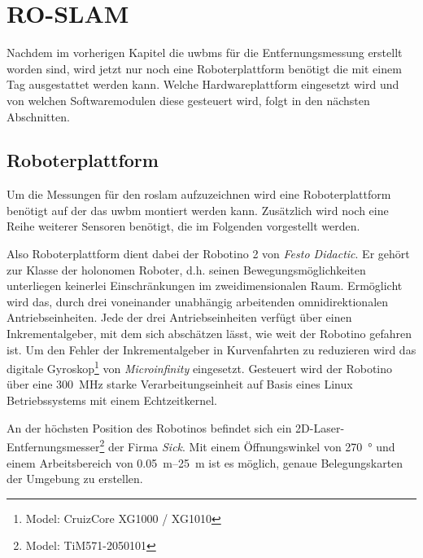 \begin{comment}
------------------------------------------------------------------------------------------
\end{comment}
\chapter{RO-SLAM}\label{ch:ro_slam}

Nachdem im vorherigen Kapitel die \Glspl{uwbm} für die Entfernungsmessung erstellt worden sind, wird jetzt nur noch eine Roboterplattform benötigt die mit einem Tag ausgestattet werden kann. Welche Hardwareplattform eingesetzt wird und von welchen Softwaremodulen diese gesteuert wird, folgt in den nächsten Abschnitten.

\begin{comment}
--------------------------------------------------------------------------------
- Einsatz mobiler Roboter in der Logistik am Beispiel des Robotino
	- http://www.r-moehrle.de/wissenschaftlicheArbeiten/robotino1.pdf
\end{comment}
\section{Roboterplattform}

Um die Messungen für den \Gls{roslam} aufzuzeichnen wird eine Roboterplattform benötigt auf der das \Gls{uwbm} montiert werden kann. Zusätzlich wird noch eine Reihe weiterer Sensoren benötigt, die im Folgenden vorgestellt werden.

Also Roboterplattform dient dabei der Robotino 2 von \textit{Festo Didactic}. Er gehört zur Klasse der holonomen Roboter, d.h. seinen Bewegungsmöglichkeiten unterliegen keinerlei Einschränkungen im zweidimensionalen Raum. Ermöglicht wird das, durch drei voneinander unabhängig arbeitenden omnidirektionalen Antriebseinheiten. Jede der drei Antriebseinheiten verfügt über einen Inkrementalgeber, mit dem sich abschätzen lässt, wie weit der Robotino gefahren ist. Um den Fehler der Inkrementalgeber in Kurvenfahrten zu reduzieren wird das digitale Gyroskop\footnote{Model: CruizCore XG1000 / XG1010} von \textit{Microinfinity} eingesetzt. Gesteuert wird der Robotino über eine \SI{300}{\MHz} starke Verarbeitungseinheit auf Basis eines Linux Betriebssystems mit einem Echtzeitkernel. \cite{festo2007robotinomanual}

An der höchsten Position des Robotinos befindet sich ein 2D-Laser-Entfernungsmesser\footnote{Model: TiM571-2050101} der Firma \textit{Sick}. Mit einem Öffnungswinkel von \SI{270}{\degree} und einem Arbeitsbereich von \SIrange{0.05}{25}{\meter} ist es möglich, genaue Belegungskarten der Umgebung zu erstellen. \cite{sick2016operatingmanual}

